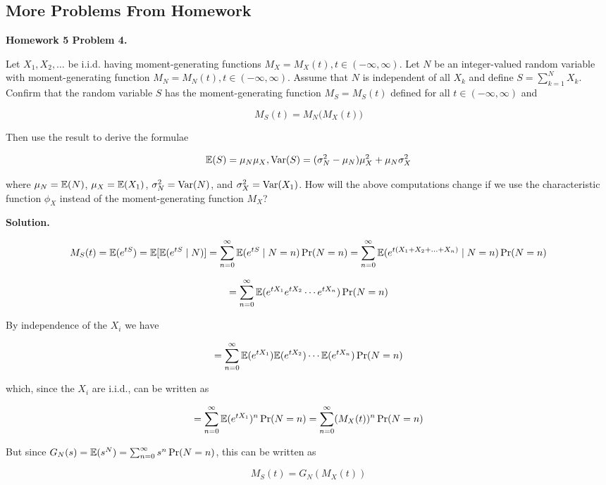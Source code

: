 %
%
%
%
%
%
%
%
%
%
\subsection{More Problems From Homework}


\textbf{Homework 5 Problem 4.}

Let \(X_1, X_2, \ldots\) be i.i.d. having moment-generating functions \(M_X = M_X(t), t \in (-\infty, \infty)\). Let \(N\) be an integer-valued random variable with moment-generating function \(M_N = M_N(t), t \in (-\infty, \infty)\). Assume that \(N\) is independent of all \(X_k\) and define \(S = \sum_{k=1}^N X_k\). Confirm that the random variable \(S\) has the moment-generating function \(M_S = M_S(t)\) defined for all \(t \in (-\infty, \infty)\) and 

\[
M_S(t) = M_N \big(M_X(t) \big)
\]

Then use the result to derive the formulae

\[
\mathbb{E}(S) = \mu_N \mu_X, \mathrm{Var}(S) = (\sigma_N^2  -\mu_N)\mu_X^2 + \mu_N \sigma_X^2
\]

where \(\mu_N = \mathbb{E}(N)\), \(\mu_X = \mathbb{E}(X_1)\), \(\sigma_N^2 = \mathrm{Var}(N)\), and \(\sigma_X^2 = \mathrm{Var}(X_1)\). How will the above computations change if we use the characteristic function \(\phi_X\) instead of the moment-generating function \(M_X\)? 

\textbf{Solution.}

\[
M_S(t) = \mathbb{E}(e^{tS}) = \mathbb{E}[ \mathbb{E}(e^{tS} \mid N)] =\sum_{n=0}^\infty \mathbb{E}(e^{tS} \mid N = n) \Pr(N = n) =\sum_{n=0}^\infty \mathbb{E}(e^{t(X_1 + X_2 + \ldots + X_n)} \mid N = n) \Pr(N = n)
\]

\[
=\sum_{n=0}^\infty \mathbb{E}(e^{tX_1} e^{tX_2}\cdots e^{t X_n} ) \Pr(N = n)
\]

By independence of the \(X_i\) we have

\[
=\sum_{n=0}^\infty \mathbb{E}(e^{tX_1}) \mathbb{E}( e^{tX_2})\cdots \mathbb{E}( e^{t X_n}) \Pr(N = n)
\]

which, since the \(X_i\) are i.i.d., can be written as

\[
=\sum_{n=0}^\infty \mathbb{E}(e^{tX_1})^n \Pr(N = n) =\sum_{n=0}^\infty (M_X(t))^n \Pr(N = n)
\]

But since \(G_N(s) = \mathbb{E}(s^N) = \sum_{n=0}^\infty s^n \Pr(N = n)\), this can be written as

\[
M_S(t) = G_N(M_X(t))
\]

